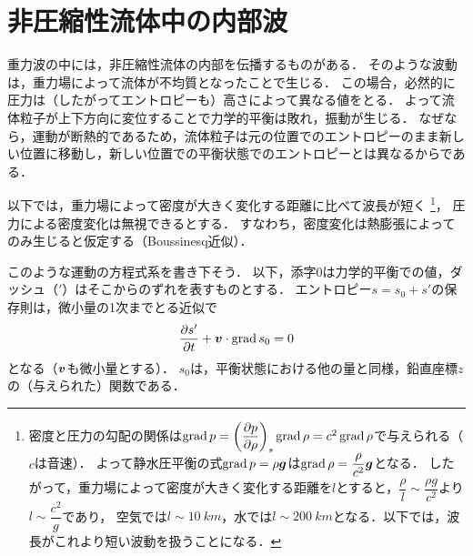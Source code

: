 \section{非圧縮性流体中の内部波}

重力波の中には，非圧縮性流体の内部を伝播するものがある．
そのような波動は，重力場によって流体が不均質となったことで生じる．
この場合，必然的に圧力は（したがってエントロピーも）高さによって異なる値をとる．
よって流体粒子が上下方向に変位することで力学的平衡は敗れ，振動が生じる．
なぜなら，運動が断熱的であるため，流体粒子は元の位置でのエントロピーのまま新しい位置に移動し，新しい位置での平衡状態でのエントロピーとは異なるからである．


以下では，重力場によって密度が大きく変化する距離に比べて波長が短く
\footnote{\spade
密度と圧力の勾配の関係は$\Grad p = \dPDV{p}{\rho}{s} \Grad\rho = c^2 \Grad\rho$で与えられる（$c$は音速）．
よって静水圧平衡の式$\operatorname{grad} p = \rho\vb*{g}$は$\operatorname{grad}\rho=\dfrac{\rho}{c^2}\vb*{g}$となる．
したがって，重力場によって密度が大きく変化する距離を$l$とすると，$\dfrac{\rho}{l} \sim \dfrac{\rho g}{c^2}$より$l \sim \dfrac{c^2}{g}$であり，
空気では$l \sim \SI{10}{km}$，水では$l \sim \SI{200}{km}$となる．以下では，波長がこれより短い波動を扱うことになる．
}，
圧力による密度変化は無視できるとする．
すなわち，密度変化は熱膨張によってのみ生じると仮定する（Boussinesq近似）．




このような運動の方程式系を書き下そう．
以下，添字0は力学的平衡での値，ダッシュ（$'$）はそこからのずれを表すものとする．
エントロピー$s=s_0+s'$の保存則は，微小量の1次までとる近似で
\begin{equation}\label{eq13.1:内部波でのエントロピー保存則}
    \pdv{s'}{t} + \vb*{v} \cdot \operatorname{grad} s_0 = 0
\end{equation}
となる（$\vb*{v}$も微小量とする）．
$s_0$は，平衡状態における他の量と同様，鉛直座標$z$の（与えられた）関数である．



